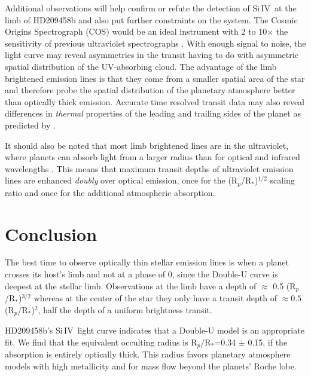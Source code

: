 \documentclass[twocolumn]{emulateapj}
\newcommand{\siIV}{\ensuremath{\mathrm{Si}\,\scriptstyle \mathrm{IV}}}
\newcommand{\p}{R$_p$/R$_*$}
\begin{document}
Additional observations will help confirm or refute the detection of \siIV\ at the limb of HD209458b and also put further constraints on the system. The Cosmic Origins Spectrograph (COS) would be an ideal instrument with 2 to 10$\times$ the sensitivity of previous ultraviolet spectrographs \citep{cos}. With enough signal to noise, the light curve may reveal asymmetries in the transit having to do with asymmetric spatial distribution of the UV-absorbing cloud. The advantage of the limb brightened emission lines is that they come from a smaller spatial area of the star and therefore probe the spatial distribution of the planetary atmosphere better than optically thick emission. Accurate time resolved transit data may also reveal differences in {\it thermal} properties of the leading and trailing sides of the planet as predicted by \citet{fortney}.

It should also be noted that most limb brightened lines are in the ultraviolet, where planets can absorb light from a larger radius than for optical and infrared wavelengths \citep{vidmad}. This means that maximum transit depths of ultraviolet emission lines are enhanced {\it doubly} over optical emission, once for the (\p )$^{1/2}$ scaling ratio and once for the additional atmospheric absorption.


\section{Conclusion}

The best time to observe optically thin stellar emission lines is when a planet crosses its host's limb and not at a phase of 0, since the Double-U curve is deepest at the stellar limb. Observations at the limb have a depth of $\approx$ 0.5 (\p )$^{3/2}$ whereas at the center of the star they only have a transit depth of  $\approx 0.5 $(\p)$^2$, half the depth of a uniform brightness transit.

HD209458b's \siIV\ light curve indicates that a Double-U model is an appropriate fit. We find that the equivalent occulting radius is \p=0.34 $\pm$ 0.15, if the absorption is entirely optically thick. This radius favors planetary atmosphere models with high metallicity and for mass flow beyond the planets' Roche lobe.
\end{document}
